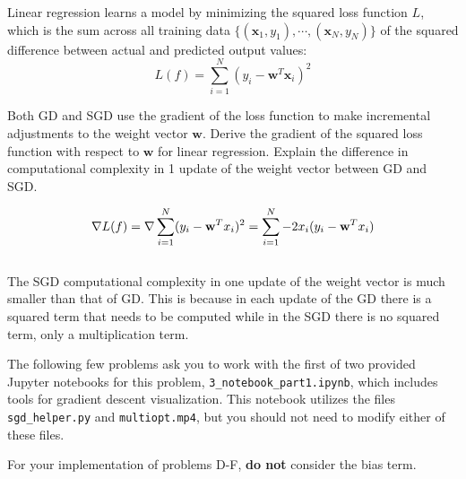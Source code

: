 Linear regression learns a model by minimizing the squared loss function $L$, which is the sum across all training data $\{(\mathbf{x}_1, y_1),\cdots,(\mathbf{x}_N, y_N)\}$ of the squared difference between actual and predicted output values:
\[L(f) = \sum_{i=1}^N (y_i - \mathbf{w}^T\mathbf{x}_i)^2\]

\begin{problem}[2]
  Both GD and SGD use the gradient of the loss function to make incremental adjustments to the weight vector $\mathbf{w}$. Derive the gradient of the squared loss function with respect to $\mathbf{w}$ for linear regression. Explain the difference in computational complexity in 1 update of the weight vector between GD and SGD. 
\end{problem}
\begin{solution}
  $$\nabla L(f) = \nabla \sum_{i = 1}^{N}(y_i - \bold{w}^Tx_i)^2 = \sum_{i = 1}^{N}-2x_i(y_i - \bold{w}^Tx_i)$$\\
  The SGD computational complexity in one update of the weight vector is much smaller than that of GD. This is because in each update of the GD there is a squared term that needs to be computed while in the SGD there is no squared term, only a multiplication term. 
\end{solution}

The following few problems ask you to work with the first of two provided Jupyter notebooks for this problem, \texttt{3_notebook_part1.ipynb}, which includes tools for gradient descent visualization. This notebook utilizes the files \texttt{sgd_helper.py} and \texttt{multiopt.mp4}, but you should not need to modify either of these files. 

For your implementation of problems D-F, \textbf{do not} consider the bias term.

